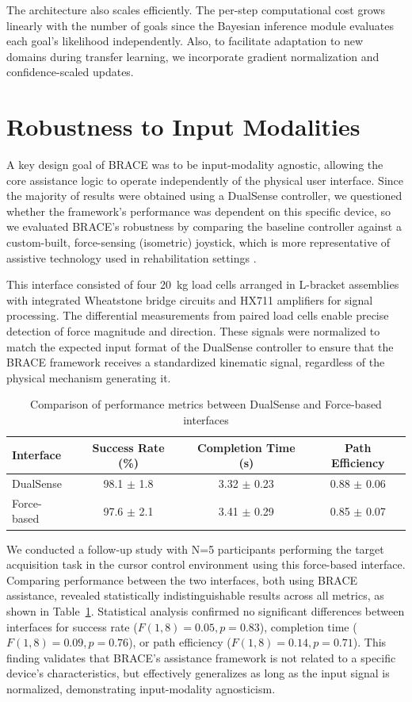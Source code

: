 \documentclass[11pt]{article}
\begin{document}
The architecture also scales efficiently. The per-step computational cost grows linearly with the number of goals since the Bayesian inference module evaluates each goal's likelihood independently. Also, to facilitate adaptation to new domains during transfer learning, we incorporate gradient normalization and confidence-scaled updates.

\section{Robustness to Input Modalities}
A key design goal of BRACE was to be input-modality agnostic, allowing the core assistance logic to operate independently of the physical user interface. Since the majority of results were obtained using a DualSense controller, we questioned whether the framework's performance was dependent on this specific device, so we evaluated BRACE's robustness by comparing the baseline controller against a custom-built, force-sensing (isometric) joystick, which is more representative of assistive technology used in rehabilitation settings \cite{force}.

This interface consisted of four 20~kg load cells arranged in L-bracket assemblies with integrated Wheatstone bridge circuits and HX711 amplifiers for signal processing. The differential measurements from paired load cells enable precise detection of force magnitude and direction. These signals were normalized to match the expected input format of the DualSense controller to ensure that the BRACE framework receives a standardized kinematic signal, regardless of the physical mechanism generating it.

\begin{table}[h]
\caption{Comparison of performance metrics between DualSense and Force-based interfaces}
\label{tab:interface_comparison}
\centering
\begin{tabular}{lccc} %
\toprule
Interface & Success Rate (\%) & Completion Time (s) & Path Efficiency \\
\midrule
DualSense & 98.1 $\pm$ 1.8 & 3.32 $\pm$ 0.23 & 0.88 $\pm$ 0.06 \\
Force-based & 97.6 $\pm$ 2.1 & 3.41 $\pm$ 0.29 & 0.85 $\pm$ 0.07 \\
\bottomrule
\end{tabular}
\end{table}

We conducted a follow-up study with N=5 participants performing the target acquisition task in the cursor control environment using this force-based interface. Comparing performance between the two interfaces, both using BRACE assistance, revealed statistically indistinguishable results across all metrics, as shown in Table~\ref{tab:interface_comparison}. Statistical analysis confirmed no significant differences between interfaces for success rate ($F(1,8)=0.05, p=0.83$), completion time ($F(1,8)=0.09, p=0.76$), or path efficiency ($F(1,8)=0.14, p=0.71$). This finding validates that BRACE's assistance framework is not related to a specific device's characteristics, but effectively generalizes as long as the input signal is normalized, demonstrating input-modality agnosticism.
\end{document}
